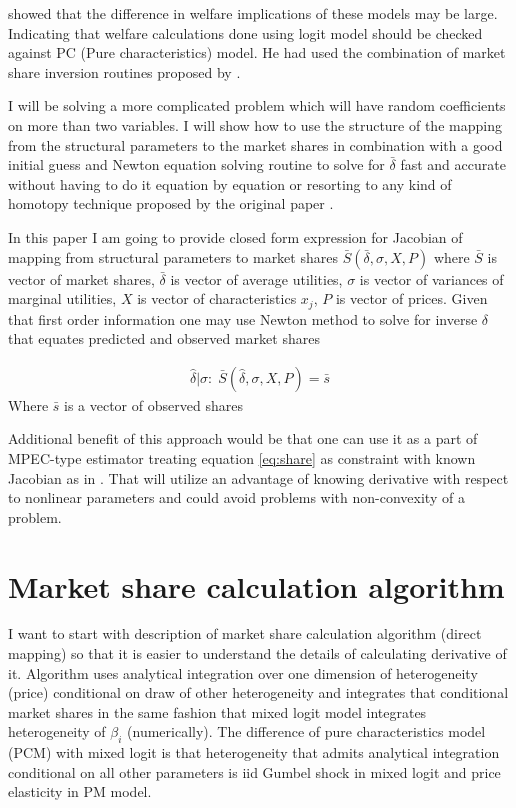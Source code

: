 \documentclass[12pt,letterpaper]{article}
\begin{document}
	
	\cite{song2007measuring} showed that the difference in welfare implications of these models may be large. Indicating that welfare calculations done using logit model should be checked against PC (Pure characteristics) model. He had used the combination of market share inversion routines proposed by \cite{berry2007pure}.
	
	I will be solving a more complicated problem which will have random coefficients on more than two variables. I will show how to use the structure of the mapping from the structural parameters to the market shares in combination with a good initial guess and Newton equation solving routine to solve for $\bar \delta$ fast and accurate without having to do it equation by equation or resorting to any kind of homotopy technique proposed by the original paper \cite{berry2007pure}.
	
	In this paper I am going to provide closed form expression for Jacobian of mapping from structural parameters to market shares $\bar S(\bar \delta,\sigma,X,P)$ where $\bar S$ is vector of market shares, $\bar \delta$ is vector of average utilities, $\sigma$ is vector of variances of marginal utilities, $X$ is vector of characteristics $x_j$, $P$ is vector of prices. Given that first order information one may use Newton method to solve for inverse $\delta$ that equates predicted and observed market shares
	
	\begin{align}
	\hat\delta|\sigma:\; \bar S(\hat\delta,\sigma,X,P) = \bar s \label{eq:share}
	\end{align}
	Where $\bar s$ is a vector of observed shares
	
	Additional benefit of this approach would be that one can use it as a part of MPEC-type estimator treating equation \ref{eq:share} as constraint with known Jacobian as in \cite{dube2012improving}. That will utilize an  advantage of knowing derivative with respect to nonlinear parameters and could avoid problems with non-convexity of a problem.
	
	\section{Market share calculation algorithm}
	
	I want to start with description of market share calculation algorithm (direct mapping) so that it is easier to understand the details of calculating derivative of it. Algorithm uses analytical integration over one dimension of heterogeneity (price) conditional on draw of other heterogeneity and integrates that conditional market shares in the same fashion that mixed logit model integrates heterogeneity of $\beta_i$ (numerically). The difference of pure characteristics model (PCM) with mixed logit is that heterogeneity that admits analytical integration conditional on all other parameters is iid Gumbel shock in mixed logit and price elasticity in PM model. 
	
\end{document}
